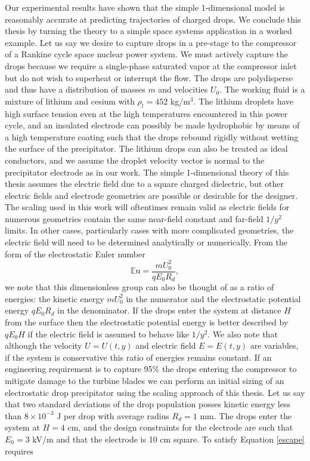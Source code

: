 \documentclass[12pt,a4paper,oneside]{book}
\begin{document}
Our experimental results have shown that the simple 1-dimensional model is reasonably accurate at predicting trajectories of charged drops.   We conclude this thesis by turning the theory to a simple space systems application in a worked example. Let us say we desire to capture drops in a pre-stage to the compressor of a Rankine cycle space nuclear power system. We must actively capture the drops because we require a single-phase saturated vapor at the compressor inlet but do not wish to superheat or interrupt the flow. The drops are polydisperse and thus have a distribution of masses $m$ and velocities $U_0$. The working fluid is a mixture of lithium and cesium with $\rho_l = 452$ kg/m$^3$. The lithium droplets have high surface tension even at the high temperatures encountered in this power cycle, and an insulated electrode can possibly be made hydrophobic by means of a high temperature coating such that the drops rebound rigidly without wetting the surface of the precipitator. The lithium drops can also be treated as ideal conductors, and we assume the droplet velocity vector is normal to the precipitator electrode as in our work. The simple 1-dimensional theory of this thesis assumes the electric field due to a square charged dielectric, but other electric fields and electrode geometries are possible or desirable for the designer. The scaling used in this work will oftentimes remain valid as electric fields for numerous geometries contain the same near-field constant and far-field $1/y^2$ limits. In other cases, particularly cases with more complicated geometries, the electric field will need to be determined analytically or numerically. From the form of the electrostatic Euler number
\[
\mathbb{E}\mbox{u} = \frac{m U_0^2}{q E_0 R_d},
\]
we note that this dimensionless group can also be thought of as a ratio of energies: the kinetic energy $m U_0^2$ in the numerator and the electrostatic potential energy $q E_0 R_d$ in the denominator. If the drops enter the system at distance $H$ from the surface then the electrostatic potential energy is better described by $q E_0 H$ if the electric field is assumed to behave like $1/y^2$. We also note that although the velocity $U = U(t,y)$ and electric field $E = E(t,y)$ are variables, if the system is conservative this ratio of energies remains constant. If an engineering requirement is to capture 95\% the drops entering the compressor to mitigate damage to the turbine blades we can perform an initial sizing of an electrostatic drop precipitator using the scaling approach of this thesis. Let us say that two standard deviations of the drop population posses kinetic energy less than $8 \times 10^{-3}$ J per drop with average radius $R_d = 1$ mm. The drops enter the system at $H=4$ cm, and the design constraints for the electrode are such that $E_0=3$ kV/m and that the electrode is 10 cm square. To satisfy Equation \ref{escape} requires
\end{document}
